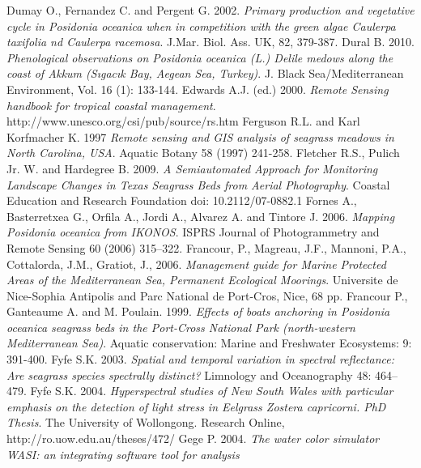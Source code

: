 \documentclass[10pt, a4paper]{article}
\begin{document}
\begin{thebibliography}{999}
Dumay O., Fernandez C. and Pergent G. 2002. \emph{Primary production and vegetative cycle
in \textit{Posidonia oceanica} when in competition with the green algae Caulerpa taxifolia nd
Caulerpa racemosa}. J.Mar. Biol. Ass. UK, 82, 379-387. \pageref{Dumay02}
Dural B. 2010. \emph{Phenological observations on \textit{Posidonia oceanica} (L.) Delile medows
along the coast of Akkum (Sıgacık Bay, Aegean Sea, Turkey)}. J. Black Sea/Mediterranean
Environment, Vol. 16 (1): 133-144. \pageref{Dural10}
Edwards A.J. (ed.) 2000. \emph{Remote Sensing handbook for tropical coastal management}.
http://www.unesco.org/csi/pub/source/rs.htm \pageref{Edwards00}
Ferguson R.L. and Karl Korfmacher K. 1997 \emph{Remote sensing and GIS analysis of seagrass
meadows in North Carolina, USA}. Aquatic Botany 58 (1997) 241-258. \pageref{Ferguson97}
Fletcher R.S., Pulich Jr. W. and Hardegree B. 2009. \emph{A Semiautomated Approach for
Monitoring Landscape Changes in Texas Seagrass Beds from Aerial Photography}. Coastal
Education and Research Foundation doi: 10.2112/07-0882.1 \pageref{Fletcher09}
Fornes A., Basterretxea G., Orfila A., Jordi A., Alvarez A. and Tintore J. 2006. \emph{Mapping
\textit{Posidonia oceanica} from IKONOS}. ISPRS Journal of Photogrammetry and Remote Sensing
60 (2006) 315–322. \pageref{Fornes06}
Francour, P., Magreau, J.F., Mannoni, P.A., Cottalorda, J.M., Gratiot, J., 2006.
\emph{Management guide for Marine Protected Areas of the Mediterranean Sea, Permanent
Ecological Moorings}. Universite de Nice-Sophia Antipolis and Parc National de Port-Cros,
Nice, 68 pp. \pageref{Francour06}
Francour P., Ganteaume A. and M. Poulain. 1999. \emph{Effects of boats anchoring in
\textit{Posidonia oceanica} seagrass beds in the Port-Cross National Park (north-western
Mediterranean Sea)}. Aquatic conservation: Marine and Freshwater Ecosystems: 9: 391-400. \pageref{Francour99}
Fyfe S.K. 2003. \emph{Spatial and temporal variation in spectral reflectance: Are seagrass
species spectrally distinct?} Limnology and Oceanography 48: 464–479. \pageref{Fyfe03}
Fyfe S.K. 2004. \emph{Hyperspectral studies of New South Wales with particular emphasis on
the detection of light stress in Eelgrass Zostera capricorni. PhD Thesis}. The University of
Wollongong. Research Online, http://ro.uow.edu.au/theses/472/ \pageref{Fyfe03}
Gege P. 2004. \emph{The water color simulator WASI: an integrating software tool for analysis
}
\end{thebibliography}
\end{document}
